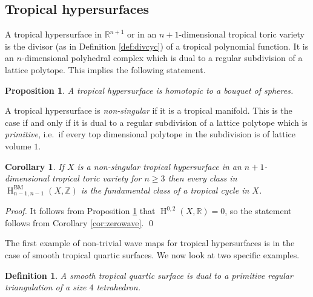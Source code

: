 \documentclass[11pt]{article}
\numberwithin{equation}{numsection}
\newcommand{\Z}{{\mathbb Z}}
\newcommand{\R}{{\mathbb R}}
\DeclareMathOperator{\BM}{BM}
\DeclareMathOperator{\HH}{H}
\newtheorem{defn}[thm]{Definition}
\newtheorem{prop}[thm]{Proposition}
\newtheorem{corollary}[thm]{Corollary}
\begin{document}
\subsection{Tropical hypersurfaces}


A tropical hypersurface in $\R^{n+1}$ or in an $n+1$-dimensional tropical toric variety is the divisor (as in Definition \ref{def:divcyc}) 
of a tropical polynomial function.
It is an $n$-dimensional polyhedral complex which is dual to a 
regular subdivision of a lattice polytope. This implies the following statement.






\begin{prop}\label{prop:bouquet}
A tropical hypersurface is homotopic to a bouquet of spheres. 
\end{prop}

A tropical hypersurface is \emph{non-singular} if it is  a tropical manifold. 
This is the case  if and only if it is dual 
to a  regular subdivision of a lattice polytope which is \emph{primitive}, 
i.e.~if every top dimensional polytope in the subdivision is of lattice volume $1$.

\begin{corollary}
If $X$ is a non-singular tropical hypersurface in an $n+1$-dimensional tropical toric variety for $n \geq 3$ 
then every class in $\HH^{\BM}_{n-1, n-1}(X, \Z)$ is the fundamental class of a tropical cycle in $X$. 

\end{corollary}

\begin{proof}
It follows from  Proposition \ref{prop:bouquet} 
that 
$\HH^{0,2}(X, \R)  = 0$, 
so the statement follows from Corollary \ref{cor:zerowave}.
\qed
\end{proof}

The first example of non-trivial wave maps for tropical hypersurfaces is in the case of  smooth tropical quartic  surfaces.
We now look at two specific  examples.

\begin{defn}
A smooth  tropical  quartic surface is dual to a primitive regular triangulation of a size $4$ tetrahedron.
\end{defn}
\end{document}
